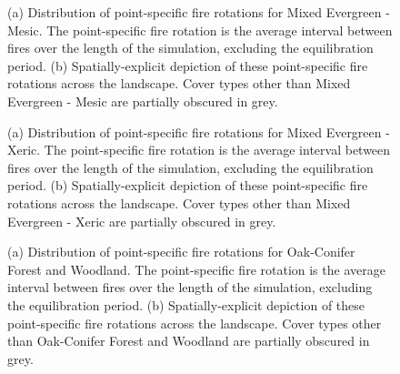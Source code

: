 \begin{figure}[!htbp]
  \centering
  \caption{(a) Distribution of point-specific fire rotations for Mixed Evergreen - Mesic. The point-specific fire rotation is the average interval between fires over the length of the simulation, excluding the equilibration period. (b) Spatially-explicit depiction of these point-specific fire rotations across the landscape. Cover types other than Mixed Evergreen - Mesic are partially obscured in grey.}
    \label{fig:preturn_megm}
\end{figure}

\begin{figure}[!htbp]
  \centering
  \caption{(a) Distribution of point-specific fire rotations for Mixed Evergreen - Xeric. The point-specific fire rotation is the average interval between fires over the length of the simulation, excluding the equilibration period. (b) Spatially-explicit depiction of these point-specific fire rotations across the landscape. Cover types other than Mixed Evergreen - Xeric are partially obscured in grey.}
\label{fig:preturn_megx}
\end{figure}

\begin{figure}[!htbp]
  \centering
  \caption{(a) Distribution of point-specific fire rotations for Oak-Conifer Forest and Woodland. The point-specific fire rotation is the average interval between fires over the length of the simulation, excluding the equilibration period. (b) Spatially-explicit depiction of these point-specific fire rotations across the landscape. Cover types other than Oak-Conifer Forest and Woodland are partially obscured in grey.}
\label{fig:preturn_ocfw}
\end{figure}

